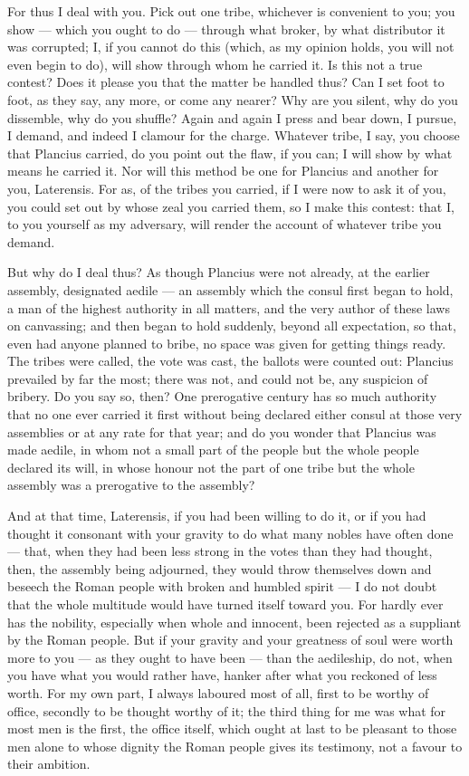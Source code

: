  For thus I deal with you. Pick out one tribe, whichever is convenient to you; you show --- which you ought to do --- through what broker, by what distributor it was corrupted; I, if you cannot do this (which, as my opinion holds, you will not even begin to do), will show through whom he carried it. Is this not a true contest? Does it please you that the matter be handled thus? Can I set foot to foot, as they say, any more, or come any nearer? Why are you silent, why do you dissemble, why do you shuffle? Again and again I press and bear down, I pursue, I demand, and indeed I clamour for the charge. Whatever tribe, I say, you choose that Plancius carried, do you point out the flaw, if you can; I will show by what means he carried it. Nor will this method be one for Plancius and another for you, Laterensis. For as, of the tribes you carried, if I were now to ask it of you, you could set out by whose zeal you carried them, so I make this contest: that I, to you yourself as my adversary, will render the account of whatever tribe you demand.

 But why do I deal thus? As though Plancius were not already, at the earlier assembly, designated aedile --- an assembly which the consul first began to hold, a man of the highest authority in all matters, and the very author of these laws on canvassing; and then began to hold suddenly, beyond all expectation, so that, even had anyone planned to bribe, no space was given for getting things ready. The tribes were called, the vote was cast, the ballots were counted out: Plancius prevailed by far the most; there was not, and could not be, any suspicion of bribery. Do you say so, then? One prerogative century has so much authority that no one ever carried it first without being declared either consul at those very assemblies or at any rate for that year; and do you wonder that Plancius was made aedile, in whom not a small part of the people but the whole people declared its will, in whose honour not the part of one tribe but the whole assembly was a prerogative to the assembly?

 And at that time, Laterensis, if you had been willing to do it, or if you had thought it consonant with your gravity to do what many nobles have often done --- that, when they had been less strong in the votes than they had thought, then, the assembly being adjourned, they would throw themselves down and beseech the Roman people with broken and humbled spirit --- I do not doubt that the whole multitude would have turned itself toward you. For hardly ever has the nobility, especially when whole and innocent, been rejected as a suppliant by the Roman people. But if your gravity and your greatness of soul were worth more to you --- as they ought to have been --- than the aedileship, do not, when you have what you would rather have, hanker after what you reckoned of less worth. For my own part, I always laboured most of all, first to be worthy of office, secondly to be thought worthy of it; the third thing for me was what for most men is the first, the office itself, which ought at last to be pleasant to those men alone to whose dignity the Roman people gives its testimony, not a favour to their ambition.

